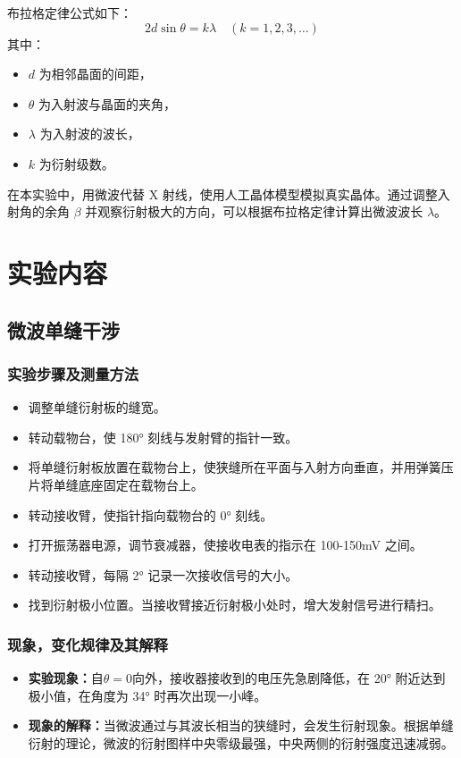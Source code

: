 \documentclass[zihao=5, UTF8]{article}
\theoremstyle{MyLineTheoremStyle} %
\theoremstyle{MyBlockTheoremStyle} %
\theoremstyle{MySubsubsectionStyle} %
\begin{document}
布拉格定律公式如下：
\[
2d\sin\theta = k\lambda \quad (k = 1, 2, 3, \ldots)
\]
其中：
\begin{itemize}
    \item $d$ 为相邻晶面的间距，
    \item $\theta$ 为入射波与晶面的夹角，
    \item $\lambda$ 为入射波的波长，
    \item $k$ 为衍射级数。
\end{itemize}

在本实验中，用微波代替 X 射线，使用人工晶体模型模拟真实晶体。通过调整入射角的余角 $\beta$ 并观察衍射极大的方向，可以根据布拉格定律计算出微波波长 $\lambda$。


\section{实验内容}
\subsection{微波单缝干涉}
\subsubsection{实验步骤及测量方法}
\begin{itemize}
    \item 调整单缝衍射板的缝宽。
    \item 转动载物台，使 180° 刻线与发射臂的指针一致。
    \item 将单缝衍射板放置在载物台上，使狭缝所在平面与入射方向垂直，并用弹簧压片将单缝底座固定在载物台上。
    \item 转动接收臂，使指针指向载物台的 0° 刻线。
    \item 打开振荡器电源，调节衰减器，使接收电表的指示在 100-150mV 之间。
    \item 转动接收臂，每隔 2° 记录一次接收信号的大小。
    \item 找到衍射极小位置。当接收臂接近衍射极小处时，增大发射信号进行精扫。
\end{itemize}
\subsubsection{现象，变化规律及其解释}
\begin{itemize}
  \item \textbf{实验现象：}自$\theta = 0$向外，接收器接收到的电压先急剧降低，在 20° 附近达到极小值，在角度为 34° 时再次出现一小峰。
  \item \textbf{现象的解释：}当微波通过与其波长相当的狭缝时，会发生衍射现象。根据单缝衍射的理论，微波的衍射图样中央零级最强，中央两侧的衍射强度迅速减弱。 
\end{itemize}
\end{document}
